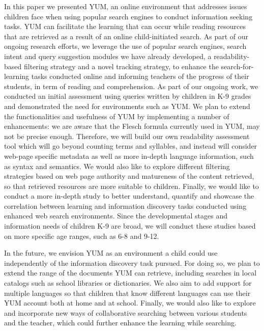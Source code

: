 \documentclass{sig-alternate-05-2015}
\begin{document}
In this paper we presented YUM, an online environment that addresses issues children face when using popular search engines to conduct information seeking tasks. YUM can facilitate the learning that can occur while reading resources that are retrieved as a result of an online child-initiated search. As part of our ongoing research efforts, we leverage the use of popular search engines, search intent and query suggestion modules we have already developed, a readability-based filtering strategy and a novel tracking strategy, to enhance the search-for-learning tasks conducted online and informing teachers of the progress of their students, in term of reading and comprehension. As part of our ongoing work, we conducted an initial assessment using queries written by children in K-9 grades and demonstrated the need for environments such as YUM. 
We plan to extend the functionalities and usefulness of YUM by implementing a number of enhancements: we are aware that the Flesch  formula currently used in YUM, may not be precise enough. Therefore, we will build our own readability assessment tool which will go beyond counting terms and syllables, and instead will consider web-page specific metadata as well as more in-depth language information, such as syntax and semantics.  We would also like to explore different filtering strategies based on web page authority and matureness of the content retrieved, so that retrieved resources are more suitable to children.  Finally, we would like to conduct a more in-depth study to better understand, quantify and showcase the correlation between learning and information discovery tasks conducted using enhanced web search environments.  Since the developmental stages and information needs of children K-9 are broad, we will conduct these studies based on more specific age ranges, such as 6-8 and 9-12. 

In the future, we envision YUM as an environment a child could use independently of the information discovery task pursued. For doing so, we plan to extend the range of the documents YUM can retrieve, including searches in local catalogs such as school libraries or dictionaries. We also aim to add support for multiple languages so that children that know different languages can use their YUM account both at home and at school. Finally, we would also like to explore and incorporate new ways of collaborative searching between various students and the teacher, which could further enhance the learning while searching. 


%

%
%
\end{document}
